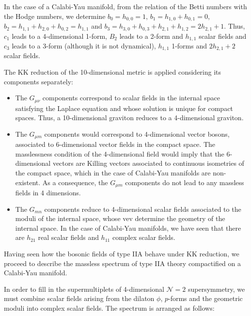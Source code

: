 In the case of a Calabi-Yau manifold, from the relation of the Betti numbers with the Hodge numbers,
we determine $b_0=h_{0,0}=1$, $b_1=h_{1,0}+h_{0,1}=0$, $b_2=h_{1,1}+h_{2,0}+h_{0,2}=h_{1,1}$ and
$b_3=h_{3,0}+h_{0,3}+h_{2,1}+h_{1,2}=2h_{2,1}+1$.
Thus, $c_1$ leads to a 4-dimensional 1-form, 
$B_2$ leads to a 2-form and  $h_{1,1}$ scalar fields 
and $c_3$ leads to a 3-form (although it is not dynamical), $h_{1,1}$ 1-forms and $2h_{2,1}+2$ scalar fields.

The KK reduction of the 10-dimensional metric is applied considering its components separately:
\begin{itemize}
  \item The $G_{\mu\nu}$ components correspond to scalar fields in the internal space satisfying 
    the Laplace equation and whose solution is unique for compact spaces.
    Thus, a 10-dimensional graviton reduces to a 4-dimensional graviton.
  \item The $G_{\mu m}$ components would correspond to 4-dimensional vector bosons, associated
    to 6-dimensional vector fields in the compact space. 
    The masslessness condition of the 4-dimensional field would imply that the 6-dimensional 
    vectors are Killing vectors associated to continuous isometries of the compact space, which
    in the case of Calabi-Yau manifolds are non-existent.
    As a consequence, the $G_{\mu m}$ components do not lead to any massless fields in 4 dimensions.
  \item The $G_{m n}$ components reduce to 4-dimensional scalar fields associated to the moduli of the internal space,
    whose vev determine the geometry of the internal space.
    In the case of Calabi-Yau manifolds, we have seen that there are $h_{21}$ real scalar fields and
    $h_{11}$ complex scalar fields.

%
%
\end{itemize}

Having seen how the bosonic fields of type IIA behave under KK reduction, we proceed to describe the
massless spectrum of type IIA theory compactified on a Calabi-Yau manifold.

In order to fill in the supermultiplets of 4-dimensional $\mathcal N=2$ supersymmetry,
we must combine scalar fields arising from the dilaton $\phi$, $p$-forms and the geometric
moduli into complex scalar fields.
The spectrum is arranged as follows:


